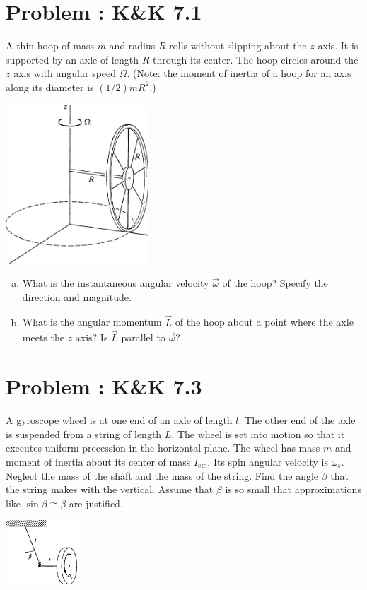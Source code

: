\documentclass[problems]{esg8012pset}
\date{Month Day\csname latex@error\endcsname {Date not yet decided}}
\begin{document}
\section{Problem \thesection: K\&K 7.1}
  A thin hoop of mass $m$ and radius $R$ rolls without slipping about the $z$ axis. It is supported by an axle of length $R$ through its center. The hoop circles around the $z$ axis with angular speed $\Omega$. (Note: the moment of inertia of a hoop for an axis along its diameter is $(1 / 2)mR^2$.)
  \begin{center}\includegraphics[width=0.4\textwidth]{ps11_1}\end{center}
  \begin{enumerate}[(a)]
    \item What is the instantaneous angular velocity $\vec \omega$ of the hoop? Specify the direction and magnitude.
    \item What is the angular momentum $\vec L$ of the hoop about a point where the axle meets the $z$ axis? Is $\vec L$ parallel to $\vec \omega$?
  \end{enumerate}
\section{Problem \thesection: K\&K 7.3}
  A gyroscope wheel is at one end of an axle of length $l$. The other end of the axle is suspended from a string of length $L$. The wheel is set into motion so that it executes uniform precession in the horizontal plane. The wheel has mass $m$ and moment of inertia about its center of mass $I_\text{cm}$. Its spin angular velocity is $\omega_s$. Neglect the mass of the shaft and the mass of the string. Find the angle $\beta$ that the string makes with the vertical. Assume that $\beta$ is so small that approximations like $\sin\beta \cong \beta$ are justified.
  \begin{center}\includegraphics[width=0.2\textwidth]{ps11_2}\end{center}
\end{document}
